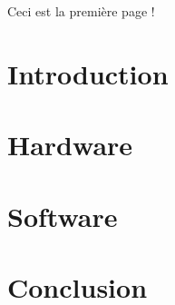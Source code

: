 \documentclass[10pt, french]{article}
\begin{document}

\LARGE{Ceci est la première page !  }


\newpage
\rmfamily{\tableofcontents} %
\newpage
{} %
\setcounter{page}{1} %

\rmfamily
\normalsize %

\section{Introduction}

\section{Hardware}


\section{Software}


\section{Conclusion}
\end{document}
